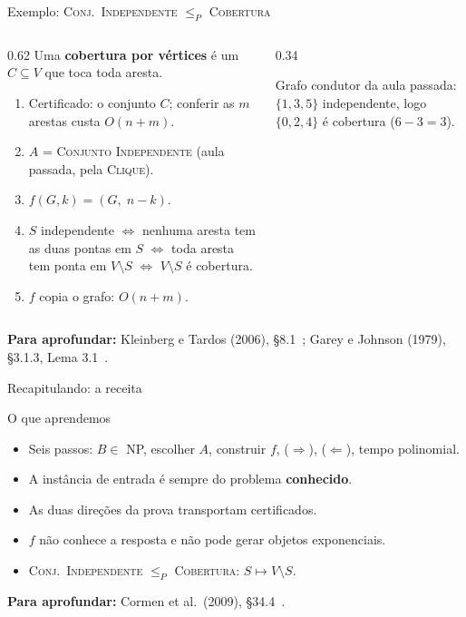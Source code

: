 \documentclass[aspectratio=169,xcolor=table]{beamer}
\newcommand{\arestashexa}{0/1, 1/2, 2/3, 3/4, 4/5, 5/0, 0/2}
\newcommand{\noshexa}{%
  \foreach \i in {0,...,5} \node[vert] (h\i) at ({90+60*\i}:0.95) {\i};
}
\newcommand{\grafohexa}[3]{%
  \noshexa
  \def\listaA{#3}\ifx\listaA\empty\else
    \foreach \u/\v in {#3} \draw[ares] (h\u) -- (h\v);\fi
  \foreach \u/\v in #1 \draw[aresta] (h\u) -- (h\v);
  \def\listaV{#2}\ifx\listaV\empty\else
    \foreach \v in {#2} \node[vS] at (h\v) {\v};\fi
}
\newcommand{\fonte}[1]{%
  \vfill
  {\tiny\color{gray!55!black}\textbf{Para aprofundar:} #1\par}%
}
\newcommand{\prob}[1]{\textsc{#1}}
\begin{document}
\begin{frame}{Exemplo: \prob{Conj.\ Independente} $\le_P$ \prob{Cobertura}}
  \begin{columns}[c]
    \begin{column}{0.62\textwidth}
      \scriptsize
      Uma \textbf{cobertura por vértices} é um $C \subseteq V$ que toca toda aresta.
      \begin{enumerate}
        \item Certificado: o conjunto $C$; conferir as $m$ arestas custa $O(n + m)$.
        \item $A$ = \prob{Conjunto Independente} (aula passada, pela \prob{Clique}).
        \item $f(G, k) = (G,\; n - k)$.
        \item[4--5.] $S$ independente $\iff$ nenhuma aresta tem as duas pontas em $S$
              $\iff$ toda aresta tem ponta em $V \setminus S$ $\iff$ $V \setminus S$ é
              cobertura.
        \item[6.] $f$ copia o grafo: $O(n + m)$.
      \end{enumerate}
    \end{column}
    \begin{column}{0.34\textwidth}
      \begin{center}
      \end{center}
      {\scriptsize Grafo condutor da aula passada: $\{1,3,5\}$ independente, logo
      $\{0,2,4\}$ é cobertura ($6 - 3 = 3$).\par}
    \end{column}
  \end{columns}
  \fonte{Kleinberg e Tardos (2006), \S 8.1~\cite{kleinberg2006algorithm};
    Garey e Johnson (1979), \S 3.1.3, Lema 3.1~\cite{garey1979computers}.}
\end{frame}

\begin{frame}{Recapitulando: a receita}
  \begin{block}{O que aprendemos}
    \begin{itemize}
      \item Seis passos: $B \in$ NP, escolher $A$, construir $f$, ($\Rightarrow$), ($\Leftarrow$),
            tempo polinomial.
      \item A instância de entrada é sempre do problema \textbf{conhecido}.
      \item As duas direções da prova transportam certificados.
      \item $f$ não conhece a resposta e não pode gerar objetos exponenciais.
      \item \prob{Conj.\ Independente} $\le_P$ \prob{Cobertura}: $S \mapsto V \setminus S$.
    \end{itemize}
  \end{block}
  \fonte{Cormen et al.\ (2009), \S 34.4~\cite{cormen2009introduction}.}
\end{frame}
\end{document}
